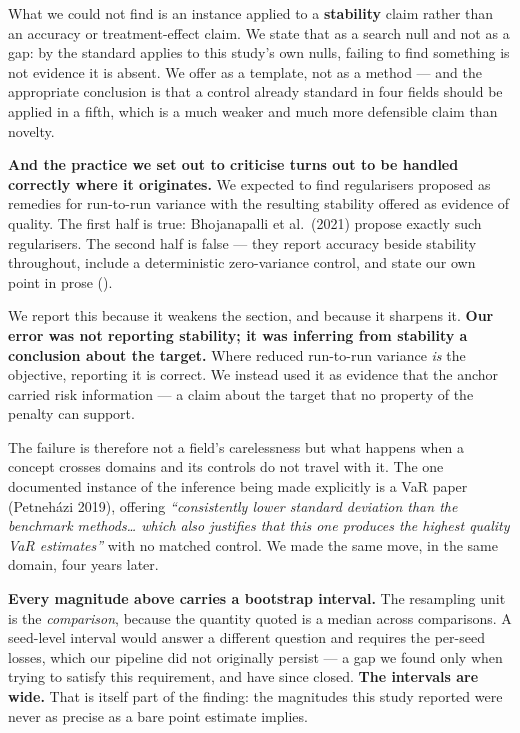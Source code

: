 What we could not find is an instance applied to a \textbf{stability} claim rather than an accuracy
or treatment-effect claim. We state that as a search null and not as a gap: by the standard 
applies to this study's own nulls, failing to find something is not evidence it is absent. We
offer  as a template, not as a method --- and the appropriate conclusion is that a control
already standard in four fields should be applied in a fifth, which is a much weaker and much
more defensible claim than novelty.

\textbf{And the practice we set out to criticise turns out to be handled correctly where it
originates.} We expected to find regularisers proposed as remedies for run-to-run variance with
the resulting stability offered as evidence of quality. The first half is true: Bhojanapalli et
al.~(2021) propose exactly such regularisers. The second half is false --- they report accuracy
beside stability throughout, include a deterministic zero-variance control, and state our own
 point in prose ().

We report this because it weakens the section, and because it sharpens it. \textbf{Our error was not
reporting stability; it was inferring from stability a conclusion about the target.} Where
reduced run-to-run variance \emph{is} the objective, reporting it is correct. We instead used it as
evidence that the anchor carried risk information --- a claim about the target that no property of
the penalty can support.

The failure is therefore not a field's carelessness but what happens when a concept crosses
domains and its controls do not travel with it. The one documented instance of the inference
being made explicitly is a VaR paper (Petneházi 2019), offering \emph{``consistently lower standard
deviation than the benchmark methods\ldots{} which also justifies that this one produces the highest
quality VaR estimates''} with no matched control. We made the same move, in the same domain, four
years later.

\textbf{Every magnitude above carries a bootstrap interval.} The resampling unit is the
\emph{comparison}, because the quantity quoted is a median across comparisons. A seed-level interval
would answer a different question and requires the per-seed losses, which our pipeline did not
originally persist --- a gap we found only when trying to satisfy this requirement, and have since
closed. \textbf{The intervals are wide.} That is itself part of the finding: the magnitudes this
study reported were never as precise as a bare point estimate implies.
